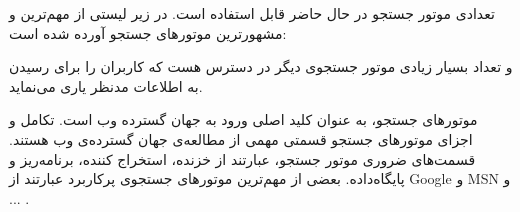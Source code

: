 تعدادی موتور جستجو در حال حاضر قابل استفاده است. در زیر لیستی از مهم‌ترین و مشهورترین موتورهای جستجو آورده شده است:



و تعداد بسیار زیادی موتور جستجوی دیگر در دسترس هست که کاربران را برای رسیدن به اطلاعات مدنظر یاری می‌نماید.

موتورهای جستجو، به عنوان کلید اصلی ورود به جهان گسترده وب است. تکامل و اجزای موتورهای جستجو قسمتی مهمی از مطالعه‌ی جهان گسترده‌ی وب هستند. قسمت‌های ضروری موتور جستجو، عبارتند از خزنده، استخراج کننده، برنامه‌ریز و پایگاه‌داده. بعضی از مهم‌ترین موتورهای جستجوی پرکاربرد عبارتند از Google و MSN و ... .
\\